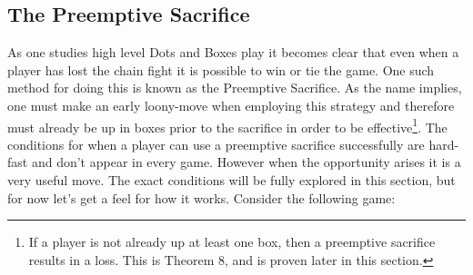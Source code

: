 \documentclass[12pt,twoside]{reedthesis}
\begin{document}
\subsection{The Preemptive  Sacrifice}
As one studies high level Dots and Boxes play it becomes clear that even when a player has lost the chain fight it is possible to win or tie the game.  One such method for doing this is known as the Preemptive Sacrifice.  As the name implies, one must make an early loony-move when employing this strategy and therefore must already be up in boxes prior to the sacrifice in order to be effective\footnote[3]{If a player is not already up at least one box, then a preemptive sacrifice results in a loss.  This is Theorem 8, and is proven later in this section.}.  The conditions for when a player can use a preemptive sacrifice successfully are hard-fast and don't appear in every game.  However when the opportunity arises it is a very useful move.  The exact conditions will be fully explored in this section, but for now let's get a feel for how it works.  Consider the following game:
\end{document}
